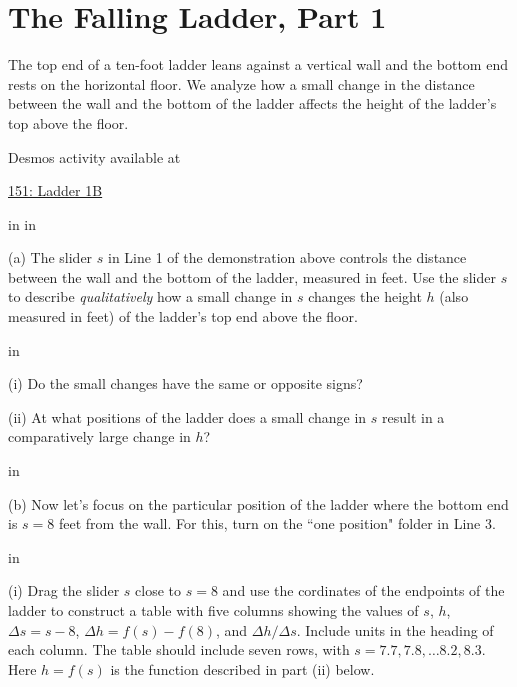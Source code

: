 \documentclass{ximera}
\newcommand{\pskip}{\vskip 0.1 in}
\begin{document}
\section{The Falling Ladder, Part 1}


\begin{example}   \label{Ex435rsfeetr}

The top end of a ten-foot ladder leans against a vertical wall and the bottom end rests on the horizontal floor. We analyze how a small change in the distance between the wall and the bottom of the ladder affects the height of the ladder's top above the floor. 

 
\begin{onlineOnly}
    \begin{center}
\end{center}
\end{onlineOnly}

Desmos activity available at

\href{https://www.desmos.com/calculator/dvyuifyyg4}{151: Ladder 1B}

\pskip \pskip

\begin{question}  \label{Qdsfesarr4}

(a) The slider $s$ in Line 1 of the demonstration above controls the distance between the wall and the bottom of the ladder, measured in feet. Use the slider $s$ to describe \emph{qualitatively} how a small change in $s$ changes the height $h$ (also measured in feet) of the ladder's top end above the floor. 

\pskip

(i) Do the small changes have the same or opposite signs?

(ii) At what positions of the ladder does a small change in $s$ result in a comparatively large change in $h$?

\pskip

(b) Now let's focus on the particular position of the ladder where the bottom end is  $s=8$ feet from the wall. For this, turn on the ``one position" folder in Line 3.

\pskip

(i) Drag the slider $s$ close to $s=8$ and use the cordinates of the endpoints of the ladder to construct a table with five columns showing the values of $s$, $h$, $\Delta s = s - 8$, $\Delta h = f(s)-f(8)$, and $\Delta h / \Delta s$. Include units in the heading of each column. The table should include seven rows, with $s=7.7, 7.8, \ldots 8.2, 8.3$. Here $h=f(s)$ is the function described in part (ii) below.


\end{question}
\end{example}
\end{document}
